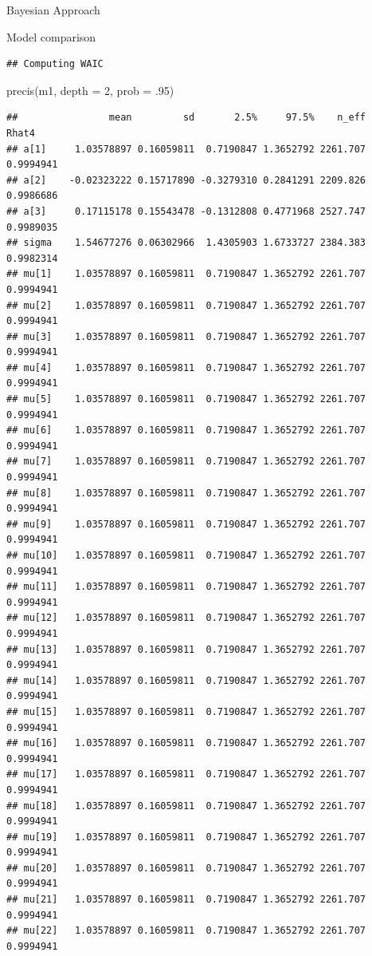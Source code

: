 \documentclass[
  ignorenonframetext,
]{beamer}
\newenvironment{Shaded}{\begin{snugshade}}{\end{snugshade}}
\newcommand{\AttributeTok}[1]{\textcolor[rgb]{0.77,0.63,0.00}{#1}}
\newcommand{\DecValTok}[1]{\textcolor[rgb]{0.00,0.00,0.81}{#1}}
\newcommand{\FunctionTok}[1]{\textcolor[rgb]{0.00,0.00,0.00}{#1}}
\newcommand{\NormalTok}[1]{#1}
\begin{document}
\begin{frame}[fragile]{Bayesian Approach}
\begin{block}{Model comparison}
\begin{verbatim}
## Computing WAIC
\end{verbatim}

\begin{Shaded}
\begin{Highlighting}[]
\FunctionTok{precis}\NormalTok{(m1, }\AttributeTok{depth =} \DecValTok{2}\NormalTok{, }\AttributeTok{prob =}\NormalTok{ .}\DecValTok{95}\NormalTok{)}
\end{Highlighting}
\end{Shaded}

\begin{verbatim}
##                mean         sd       2.5%     97.5%    n_eff     Rhat4
## a[1]     1.03578897 0.16059811  0.7190847 1.3652792 2261.707 0.9994941
## a[2]    -0.02323222 0.15717890 -0.3279310 0.2841291 2209.826 0.9986686
## a[3]     0.17115178 0.15543478 -0.1312808 0.4771968 2527.747 0.9989035
## sigma    1.54677276 0.06302966  1.4305903 1.6733727 2384.383 0.9982314
## mu[1]    1.03578897 0.16059811  0.7190847 1.3652792 2261.707 0.9994941
## mu[2]    1.03578897 0.16059811  0.7190847 1.3652792 2261.707 0.9994941
## mu[3]    1.03578897 0.16059811  0.7190847 1.3652792 2261.707 0.9994941
## mu[4]    1.03578897 0.16059811  0.7190847 1.3652792 2261.707 0.9994941
## mu[5]    1.03578897 0.16059811  0.7190847 1.3652792 2261.707 0.9994941
## mu[6]    1.03578897 0.16059811  0.7190847 1.3652792 2261.707 0.9994941
## mu[7]    1.03578897 0.16059811  0.7190847 1.3652792 2261.707 0.9994941
## mu[8]    1.03578897 0.16059811  0.7190847 1.3652792 2261.707 0.9994941
## mu[9]    1.03578897 0.16059811  0.7190847 1.3652792 2261.707 0.9994941
## mu[10]   1.03578897 0.16059811  0.7190847 1.3652792 2261.707 0.9994941
## mu[11]   1.03578897 0.16059811  0.7190847 1.3652792 2261.707 0.9994941
## mu[12]   1.03578897 0.16059811  0.7190847 1.3652792 2261.707 0.9994941
## mu[13]   1.03578897 0.16059811  0.7190847 1.3652792 2261.707 0.9994941
## mu[14]   1.03578897 0.16059811  0.7190847 1.3652792 2261.707 0.9994941
## mu[15]   1.03578897 0.16059811  0.7190847 1.3652792 2261.707 0.9994941
## mu[16]   1.03578897 0.16059811  0.7190847 1.3652792 2261.707 0.9994941
## mu[17]   1.03578897 0.16059811  0.7190847 1.3652792 2261.707 0.9994941
## mu[18]   1.03578897 0.16059811  0.7190847 1.3652792 2261.707 0.9994941
## mu[19]   1.03578897 0.16059811  0.7190847 1.3652792 2261.707 0.9994941
## mu[20]   1.03578897 0.16059811  0.7190847 1.3652792 2261.707 0.9994941
## mu[21]   1.03578897 0.16059811  0.7190847 1.3652792 2261.707 0.9994941
## mu[22]   1.03578897 0.16059811  0.7190847 1.3652792 2261.707 0.9994941

\end{verbatim}
\end{block}
\end{frame}
\end{document}
